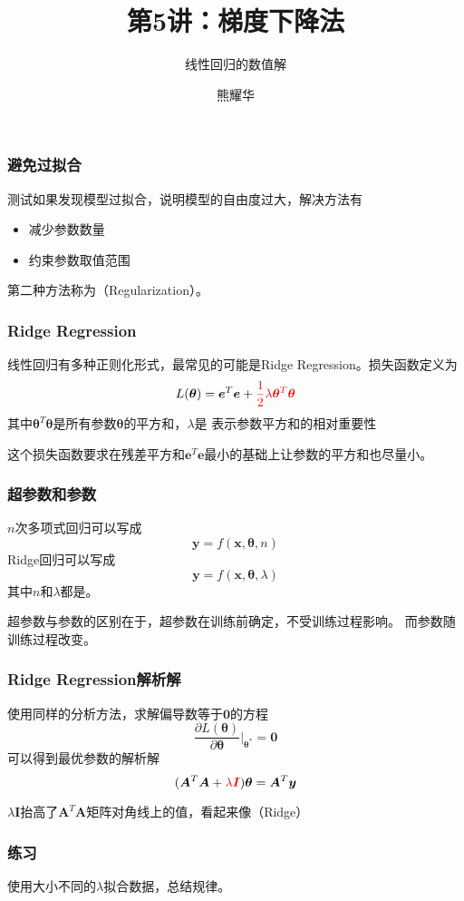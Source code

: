 \documentclass[14pt]{beamer}
\title{第5讲：梯度下降法}
\subtitle{线性回归的数值解}
\author{熊耀华}
\institute{交通工程系}
\newcommand{\mat}[1]{\bm{#1}}
\renewcommand{\vec}[1]{\bm{#1}}
\newcommand{\MA}{\mat{A}}
\newcommand{\MI}{\mat{I}}
\newcommand{\Vy}{\vec{y}}
\newcommand{\Vx}{\vec{x}}
\newcommand{\Ve}{\vec{e}}
\newcommand{\Vt}{\vec{\theta}}
\let\emph\relax %
\begin{document}
\begin{frame}
    \titlepage
\end{frame}

\begin{frame}
  \frametitle{避免过拟合}
  测试如果发现模型过拟合，说明模型的自由度过大，解决方法有
  \begin{itemize}
      \item 减少参数数量
      \item 约束参数取值范围
  \end{itemize}
  第二种方法称为\emph{正则化}（Regularization）。
\end{frame}

\begin{frame}
  \frametitle{Ridge Regression}
  线性回归有多种正则化形式，最常见的可能是Ridge Regression。损失函数定义为
  \begin{equation}
      L(\Vt)=\Ve^T\Ve+{\color{red}\frac{1}{2}\lambda\Vt^T\Vt}
  \end{equation}
  其中$\Vt^T\Vt$是所有参数$\Vt$的平方和，$\lambda$是\emph{超参数}
  表示参数平方和的相对重要性

  这个损失函数要求在残差平方和$\Ve^T\Ve$最小的基础上让参数的平方和也尽量小。
\end{frame}

\begin{frame}
  \frametitle{超参数和参数}
  $n$次多项式回归可以写成
  \[\Vy=f(\Vx,\Vt,n)\]
  Ridge回归可以写成
  \[\Vy=f(\Vx,\Vt,\lambda)\]
  其中$n$和$\lambda$都是\emph{超参数}。
  
  超参数与参数的区别在于，超参数在训练前确定，不受训练过程影响。
  而参数随训练过程改变。
\end{frame}

\begin{frame}
  \frametitle{Ridge Regression解析解}
  使用同样的分析方法，求解偏导数等于$\vec{0}$的方程
  \begin{equation}
      \frac{\partial L(\Vt)}{\partial\Vt}\bigg|_{\Vt^*}=\vec{0}
  \end{equation}
  可以得到最优参数的解析解
  \begin{equation}
      (\MA^T\MA+{\color{red}\lambda\MI})\Vt=\MA^T\Vy
  \end{equation}

  $\lambda\MI$抬高了$\MA^T\MA$矩阵对角线上的值，看起来像\emph{山脊}（Ridge）
\end{frame}

\begin{frame}
  \frametitle{练习}
  使用大小不同的$\lambda$拟合数据，总结规律。
\end{frame}
\end{document}
